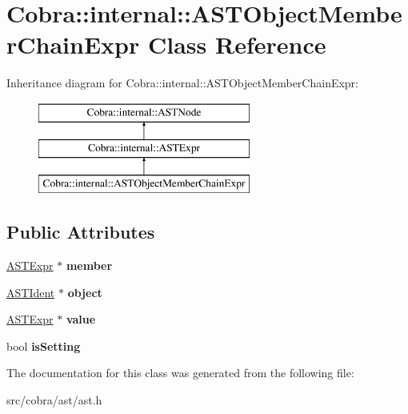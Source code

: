 \hypertarget{class_cobra_1_1internal_1_1_a_s_t_object_member_chain_expr}{\section{Cobra\+:\+:internal\+:\+:A\+S\+T\+Object\+Member\+Chain\+Expr Class Reference}
\label{class_cobra_1_1internal_1_1_a_s_t_object_member_chain_expr}
}
Inheritance diagram for Cobra\+:\+:internal\+:\+:A\+S\+T\+Object\+Member\+Chain\+Expr\+:\begin{figure}[H]
\begin{center}
\leavevmode
\includegraphics[height=3.000000cm]{class_cobra_1_1internal_1_1_a_s_t_object_member_chain_expr}
\end{center}
\end{figure}
\subsection*{Public Attributes}
\begin{DoxyCompactItemize}
\item 
\hypertarget{class_cobra_1_1internal_1_1_a_s_t_object_member_chain_expr_ab6a85fbf7191951c1de17a4208a637e7}{\hyperlink{class_cobra_1_1internal_1_1_a_s_t_expr}{A\+S\+T\+Expr} $\ast$ {\bfseries member}}\label{class_cobra_1_1internal_1_1_a_s_t_object_member_chain_expr_ab6a85fbf7191951c1de17a4208a637e7}

\item 
\hypertarget{class_cobra_1_1internal_1_1_a_s_t_object_member_chain_expr_a8661d1a44302fc804b54376b22b472e0}{\hyperlink{class_cobra_1_1internal_1_1_a_s_t_ident}{A\+S\+T\+Ident} $\ast$ {\bfseries object}}\label{class_cobra_1_1internal_1_1_a_s_t_object_member_chain_expr_a8661d1a44302fc804b54376b22b472e0}

\item 
\hypertarget{class_cobra_1_1internal_1_1_a_s_t_object_member_chain_expr_a1c21198f3672ed23e7458c1818525659}{\hyperlink{class_cobra_1_1internal_1_1_a_s_t_expr}{A\+S\+T\+Expr} $\ast$ {\bfseries value}}\label{class_cobra_1_1internal_1_1_a_s_t_object_member_chain_expr_a1c21198f3672ed23e7458c1818525659}

\item 
\hypertarget{class_cobra_1_1internal_1_1_a_s_t_object_member_chain_expr_a2c09e14e1007ea7f7e014944ef98a7c0}{bool {\bfseries is\+Setting}}\label{class_cobra_1_1internal_1_1_a_s_t_object_member_chain_expr_a2c09e14e1007ea7f7e014944ef98a7c0}

\end{DoxyCompactItemize}


The documentation for this class was generated from the following file\+:\begin{DoxyCompactItemize}
\item 
src/cobra/ast/ast.\+h\end{DoxyCompactItemize}
